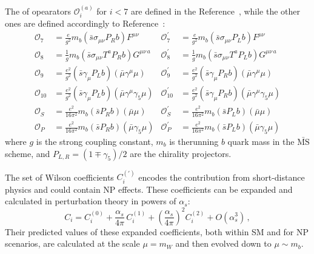 The of opearators $\mathcal O_i^{(a)}$ for $i<7$ are defined in the Reference~\cite{oper}, while the other ones are defined accordingly to Reference~\cite{Altmannshofer:2008dz}:
\begin{align}
  {\mathcal{O}}_{7} &= \frac{e}{g^2} m_b (\bar{s} \sigma_{\mu \nu} P_R b) F^{\mu \nu} &
  {\mathcal{O}}_{7}^\prime &= \frac{e}{g^2} m_b (\bar{s} \sigma_{\mu \nu} P_L b) F^{\mu \nu} \label{eq:O7}\\
  {\mathcal{O}}_{8} &= \frac{1}{g} m_b (\bar{s} \sigma_{\mu \nu} T^a P_R b) G^{\mu \nu \, a} &
  {\mathcal{O}}_{8}^\prime &= \frac{1}{g} m_b (\bar{s} \sigma_{\mu \nu} T^a P_L b) G^{\mu \nu \, a} \label{eq:O8}\\
  {\mathcal{O}}_{9} &= \frac{e^2}{g^2} (\bar{s} \gamma_{\mu} P_L b)(\bar{\mu} \gamma^\mu \mu) &
  {\mathcal{O}}_{9}^\prime &= \frac{e^2}{g^2} (\bar{s} \gamma_{\mu} P_R b)(\bar{\mu} \gamma^\mu \mu) \label{eq:O9}\\
  {\mathcal{O}}_{10} &=\frac{e^2}{g^2} (\bar{s}  \gamma_{\mu} P_L b)(\bar{\mu} \gamma^\mu \gamma_5 \mu) &
  {\mathcal{O}}_{10}^\prime &=\frac{e^2}{g^2} (\bar{s}  \gamma_{\mu} P_R b)(\bar{\mu} \gamma^\mu \gamma_5 \mu) \label{eq:O10}\\
  {\mathcal{O}}_{S} &=\frac{e^2}{16\pi^2} m_b (\bar{s} P_R b)(\bar{\mu} \mu) &
  {\mathcal{O}}_{S}^\prime &=\frac{e^2}{16\pi^2} m_b (\bar{s} P_L b)(\bar{\mu} \mu) \label{eq:OS}\\
  {\mathcal{O}}_{P} &=\frac{e^2}{16\pi^2} m_b (\bar{s} P_R b)(\bar{\mu} \gamma_5 \mu) &
  {\mathcal{O}}_{P}^\prime &=\frac{e^2}{16\pi^2} m_b (\bar{s} P_L b)(\bar{\mu} \gamma_5 \mu) \label{eq:OP}
\end{align}
where $g$ is the strong coupling constant, $m_b$ is therunning $b$ quark mass in the $\bar{\mathrm{MS}}$ scheme, and $P_{L,R}=(1\mp\gamma_5)/2$ are the chirality projectors.

The set of Wilson coefficients $C^{(\prime)}_i$ encodes the contribution from short-distance physics and could contain NP effects.
These coefficients can be expanded and calculated in perturbation theory in powers of $\alpha_s$:
\begin{equation}\label{WilExpansion}
  C_i = C_i^{(0)} + \frac{\alpha_s}{4\pi}\, C_i^{(1)} + \left(\frac{\alpha_s}{4\pi}\right)^2 C_i^{(2)} + O(\alpha_s^3)\,,
\end{equation}
Their predicted values of these expanded coefficients, both within SM and for NP scenarios, are calculated at the scale $\mu=m_W$ and then evolved down to $\mu\sim m_b$.

